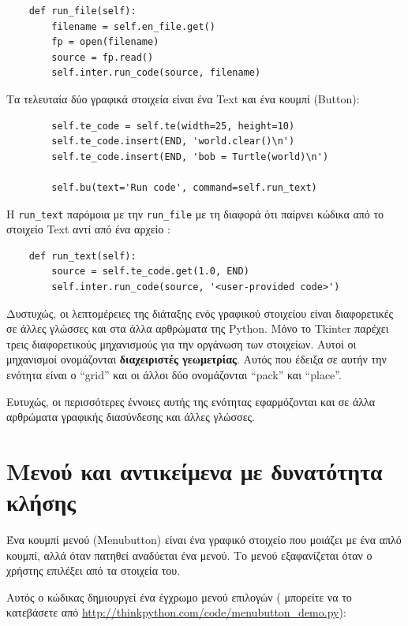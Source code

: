 \documentclass[10pt]{book}
\begin{document}
\begin{verbatim}
    def run_file(self):
        filename = self.en_file.get()
        fp = open(filename)
        source = fp.read()
        self.inter.run_code(source, filename)
\end{verbatim}
%
 Τα τελευταία δύο γραφικά στοιχεία είναι ένα  Text  και ένα κουμπί  (Button):

\begin{verbatim}
        self.te_code = self.te(width=25, height=10)
        self.te_code.insert(END, 'world.clear()\n')
        self.te_code.insert(END, 'bob = Turtle(world)\n')

        self.bu(text='Run code', command=self.run_text)
\end{verbatim}
%
 Η  \verb"run_text"  παρόμοια με την  \verb"run_file"  με τη διαφορά ότι 
παίρνει κώδικα από το στοιχείο  Text  αντί από ένα αρχείο :

\begin{verbatim}
    def run_text(self):
        source = self.te_code.get(1.0, END)
        self.inter.run_code(source, '<user-provided code>')
\end{verbatim}
%
 Δυστυχώς, οι λεπτομέρειες της διάταξης ενός γραφικού στοιχείου είναι διαφορετικές σε άλλες 
γλώσσες και στα άλλα αρθρώματα της  Python.   Μόνο το  Tkinter  παρέχει τρεις διαφορετικούς μηχανισμούς για την οργάνωση των στοιχείων.  Αυτοί οι μηχανισμοί ονομάζονται 
{\bf διαχειριστές γεωμετρίας}.  Αυτός που έδειξα σε αυτήν την ενότητα είναι ο  ``grid''  και οι άλλοι δύο ονομάζονται  ``pack''  και  ``place''.

 Ευτυχώς, οι περισσότερες έννοιες αυτής της ενότητας εφαρμόζονται και σε άλλα αρθρώματα 
γραφικής διασύνδεσης και άλλες γλώσσες.



\section{Μενού και αντικείμενα με δυνατότητα κλήσης}

Ένα κουμπί μενού  (Menubutton)  είναι ένα γραφικό στοιχείο που μοιάζει με ένα απλό 
κουμπί, αλλά όταν πατηθεί αναδύεται ένα μενού.  Το μενού εξαφανίζεται όταν ο χρήστης επιλέξει 
από τα στοιχεία του.

Αυτός ο κώδικας δημιουργεί ένα έγχρωμο μενού επιλογών  ( μπορείτε να το κατεβάσετε από  \url{http://thinkpython.com/code/menubutton_demo.py}):
\end{document}
